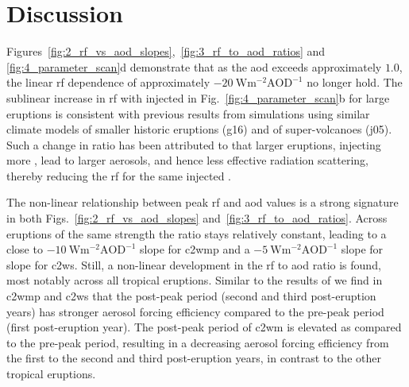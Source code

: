 \documentclass{ametsocV6.1}
\newcommand{\iso}[1][i]{{#1}njected \ce{SO2}}
\begin{document}
\section{Discussion}\label{sec:discussion}


Figures~\ref{fig:2_rf_vs_aod_slopes},~\ref{fig:3_rf_to_aod_ratios} and
\ref{fig:4_parameter_scan}d demonstrate that as the \gls{aod} exceeds approximately
\(1.0\), the linear \gls{rf} dependence of approximately
\(\SI{-20}{\watt\metre^{-2}\mathrm{AOD}^{-1}}\) no longer hold. The sublinear increase
in \gls{rf} with \iso{} in Fig.~\ref{fig:4_parameter_scan}b for large eruptions is
consistent with previous results from simulations using similar climate models of
smaller historic eruptions (\gls{g16}) and of super-volcanoes (\gls{j05}). Such a change
in ratio has been attributed to that larger eruptions, injecting more , lead to
larger aerosols, and hence less effective radiation scattering, thereby reducing the
\gls{rf} for the same \iso{} \citep{english2013, timmreck2010, timmreck2018}.

The non-linear relationship between peak \gls{rf} and \gls{aod} values is a strong
signature in both Figs.~\ref{fig:2_rf_vs_aod_slopes} and~\ref{fig:3_rf_to_aod_ratios}.
Across eruptions of the same strength the ratio stays relatively constant, leading to a
close to \(\SI{-10}{\watt\metre^{-2}\mathrm{AOD}^{-1}}\) slope for \gls{c2wmp} and a
\(\SI{-5}{\watt\metre^{-2}\mathrm{AOD}^{-1}}\) slope for slope for \gls{c2ws}. Still, a
non-linear development in the \gls{rf} to \gls{aod} ratio is found, most notably across
all tropical eruptions. Similar to the results of \citet{marshall2020} we find in
\gls{c2wmp} and \gls{c2ws} that the post-peak period (second and third post-eruption
years) has stronger aerosol forcing efficiency compared to the pre-peak period (first
post-eruption year). The post-peak period of \gls{c2wm} is elevated as compared to the
pre-peak period, resulting in a decreasing aerosol forcing efficiency from the first to
the second and third post-eruption years, in contrast to the other tropical eruptions.
\end{document}

